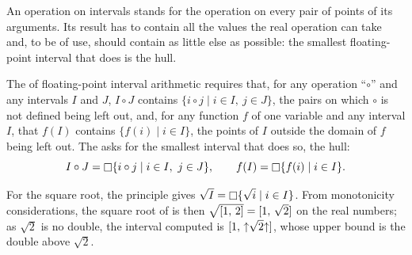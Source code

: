 An operation on intervals stands for the operation on every pair of points
of its arguments. Its result has to contain all the values the real
operation can take and, to be of use, should contain as little else as
possible: the smallest floating-point interval that does is the hull.

\begin{Def}\label{def:containment}
The  of floating-point interval arithmetic
requires that, for any operation ``$\circ$'' and any intervals $I$ and $J$,
$I\circ J$ contains $\{i\circ j\mid i\in I,\ j\in J\}$, the pairs on which
$\circ$ is not defined being left out, and, for any function $f$ of one
variable and any interval $I$, that $f(I)$ contains $\{f(i)\mid i\in I\}$,
the points of $I$ outside the domain of $f$ being left out. The
 asks for the smallest interval that does so, the
hull:
\begin{equation*}
  I\circ J=\mathop{\Box} \{i\circ j\mid i\in I,\ j\in J\},\qquad
  f(I)=\mathop{\Box} \{f(i)\mid i\in I\}.
\end{equation*}
\end{Def}

\begin{Ex}\label{ex:sqrt-functional}
For the square root, the principle gives
$\sqrt{I}=\mathop{\Box} \{\sqrt{i}\mid i\in I\}$. From monotonicity
considerations, the square root of  is then
$\sqrt{[1,\,2]}=[1,\,\sqrt{2}]$ on the real numbers; as $\sqrt2$ is
no double, the interval computed is $[1,\,\mathopen{\uparrow}\sqrt{2}\mathclose{\uparrow}]$, whose
upper bound is the double above $\sqrt2$.
\end{Ex}

